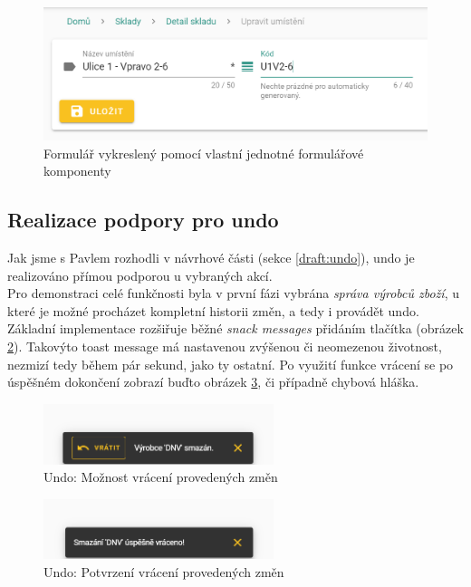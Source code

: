 \begin{figure}[]
\includegraphics[width=\textwidth]{../png/app/form_stock_location.png}
\caption{Formulář vykreslený pomocí vlastní jednotné formulářové komponenty} \label{picture:form-stock-location}
\end{figure}


\subsection{Realizace podpory pro undo}\label{implementation:undo}

Jak jsme s Pavlem rozhodli v návrhové části (sekce \ref{draft:undo}), undo je realizováno přímou podporou u vybraných akcí.\\
Pro demonstraci celé funkčnosti byla v první fázi vybrána \emph{správa výrobců zboží}, u které je možné procházet kompletní historii změn, a tedy i provádět undo. Základní implementace rozšiřuje běžné \emph{snack messages} přidáním tlačítka  (obrázek \ref{picture:undo}). Takovýto toast message má nastavenou zvýšenou či neomezenou životnost, nezmizí tedy během pár sekund, jako ty ostatní. Po využití funkce vrácení se po úspěšném dokončení zobrazí buďto obrázek \ref{picture:undo-after}, či případně chybová hláška.

\begin{figure}[]
\includegraphics[width=0.6\textwidth]{../png/app/undo_snack.png}
\caption{Undo: Možnost vrácení provedených změn} \label{picture:undo}
\end{figure}

\begin{figure}[]
\includegraphics[width=0.6\textwidth]{../png/app/undo_snack_after.png}
\caption{Undo: Potvrzení vrácení provedených změn} \label{picture:undo-after}
\end{figure}

